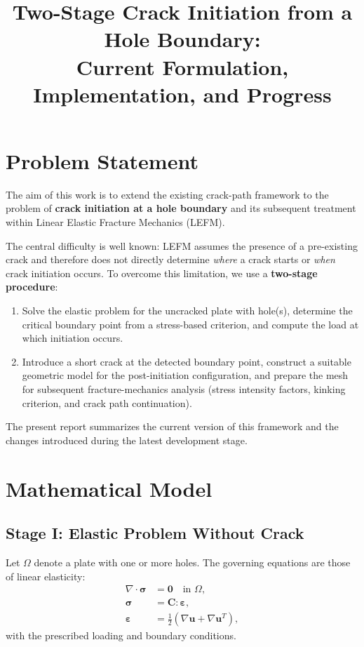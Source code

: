 \documentclass[11pt]{article}
\title{\textbf{Two-Stage Crack Initiation from a Hole Boundary:\\
		Current Formulation, Implementation, and Progress}}
\author{}
\date{}
\begin{document}
	\maketitle
	
	\section{Problem Statement}
	
	The aim of this work is to extend the existing crack-path framework to the problem of \textbf{crack initiation at a hole boundary} and its subsequent treatment within Linear Elastic Fracture Mechanics (LEFM).
	
	The central difficulty is well known: LEFM assumes the presence of a pre-existing crack and therefore does not directly determine \emph{where} a crack starts or \emph{when} crack initiation occurs. To overcome this limitation, we use a \textbf{two-stage procedure}:
	
	\begin{enumerate}[label=\textbf{Stage \Roman*.}]
		\item Solve the elastic problem for the uncracked plate with hole(s), determine the critical boundary point from a stress-based criterion, and compute the load at which initiation occurs.
		\item Introduce a short crack at the detected boundary point, construct a suitable geometric model for the post-initiation configuration, and prepare the mesh for subsequent fracture-mechanics analysis (stress intensity factors, kinking criterion, and crack path continuation).
	\end{enumerate}
	
	The present report summarizes the current version of this framework and the changes introduced during the latest development stage.
	
	\section{Mathematical Model}
	
	\subsection{Stage I: Elastic Problem Without Crack}
	
	Let $\Omega$ denote a plate with one or more holes. The governing equations are those of linear elasticity:
	\begin{align}
		\nabla \cdot \bm{\sigma} &= \bm{0} \quad \text{in } \Omega, \\
		\bm{\sigma} &= \mathbf{C} : \bm{\varepsilon}, \\
		\bm{\varepsilon} &= \frac{1}{2}\left(\nabla \bm{u} + \nabla \bm{u}^{T}\right),
	\end{align}
	with the prescribed loading and boundary conditions.
	
\end{document}
